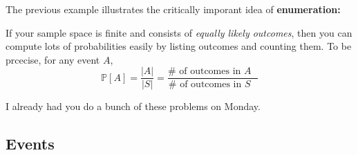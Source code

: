 \documentclass[10pt]{article}
\theoremstyle{definition}
\newcommand{\1}[1]{\textbf{1}_{\left[#1\right]}} %
\def\P{\mathbb{P}} %
\begin{document}
The previous example illustrates the critically imporant idea of \textbf{enumeration:}

\begin{center}
  \colorbox{gray!10}{%
    \begin{minipage}{0.8\textwidth}
      If your sample space is finite and consists of \textit{equally likely outcomes}, then you can
      compute lots of probabilities easily by listing outcomes and counting them. To be prcecise, for any
      event $A$,
      \begin{equation*}
        \P\left[A \right] = \frac{|A|}{|S|}  = \frac{\# \text{ of outcomes in $A$ }}{\# \text{ of outcomes in
            $S$ }}
      \end{equation*}
    \end{minipage}%
  }
\end{center}

I already had you do a bunch of these problems on Monday.




\subsection{Events}
\end{document}
